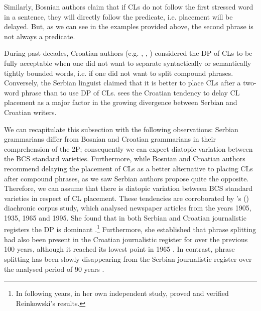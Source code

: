\noindent Similarly, Bosnian authors \citep[e.g.][471]{JHP00} claim that if CLs do not follow the first stressed word in a sentence, they will directly follow the predicate, i.e. placement will be delayed. But, as we can see in the examples provided above, the second phrase is not always a predicate. 

During past decades, Croatian authors (e.g. \citealt[150--152]{Weber59}, \citealt[150]{Jonke53}, \citealt[182]{FHM06}) considered the DP of CLs to be fully acceptable when one did not want to separate syntactically or semantically tightly bounded words, i.e. if one did not want to split compound phrases. Conversely, the Serbian linguist \citet[308]{Pesikan58} claimed that it is better to place CLs after a two-word phrase than to use DP of CLs. \citet[364]{Popovic04} sees the Croatian tendency to delay CL placement as a major factor in the growing divergence between Serbian and Croatian writers. 


We can recapitulate this subsection with the following observations: Serbian grammarians differ from Bosnian and Croatian grammarians in their comprehension of the 2P; consequently we can expect diatopic variation between the BCS standard varieties. Furthermore, while Bosnian and Croatian authors recommend delaying the placement of CLs as a better alternative to placing CLs after compound phrases, as we saw Serbian authors propose quite the opposite. Therefore, we can assume that there is diatopic variation between BCS standard varieties in respect of CL placement. These tendencies are corroborated by \citeauthor{Reinkowski01}'s (\citeyear[]{Reinkowski01}) diachronic corpus study, which analysed newspaper articles from the years 1905, 1935, 1965 and 1995. She found that in both Serbian and Croatian journalistic registers the DP is dominant \citep[cf.][183, 202]{Reinkowski01}.\footnote{In following years, in her own independent study, \citet[14]{Alexander08} proved and verified Reinkowski’s results.} Furthermore, she established that phrase splitting had also been present in the Croatian journalistic register for over the previous 100 years, although it reached its lowest point in 1965  \citep[cf.][191--195]{Reinkowski01}. In contrast, phrase splitting has been slowly disappearing from the Serbian journalistic register over the analysed period of 90 years \citep[191--195]{Reinkowski01}. 

